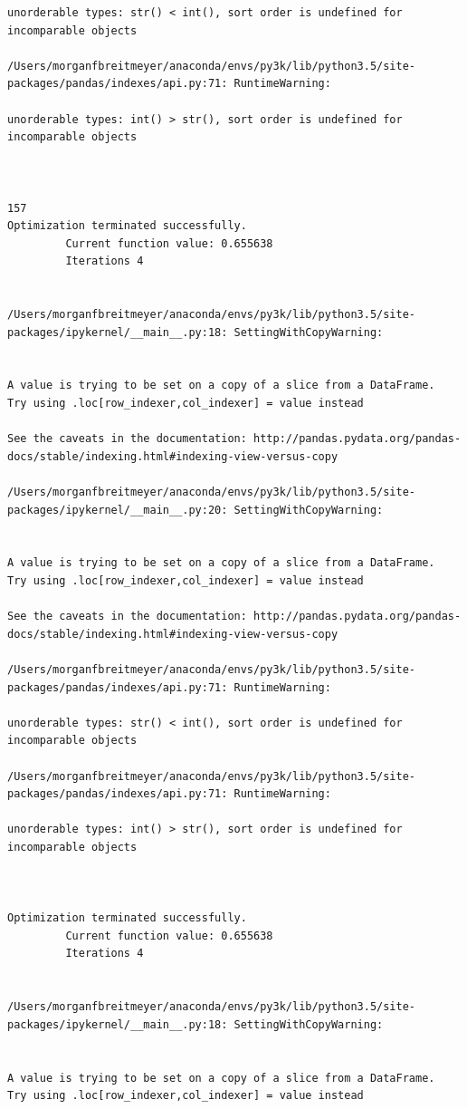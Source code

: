 \begin{lstlisting}
unorderable types: str() < int(), sort order is undefined for incomparable objects

/Users/morganfbreitmeyer/anaconda/envs/py3k/lib/python3.5/site-packages/pandas/indexes/api.py:71: RuntimeWarning:

unorderable types: int() > str(), sort order is undefined for incomparable objects



157
Optimization terminated successfully.
         Current function value: 0.655638
         Iterations 4


/Users/morganfbreitmeyer/anaconda/envs/py3k/lib/python3.5/site-packages/ipykernel/__main__.py:18: SettingWithCopyWarning:


A value is trying to be set on a copy of a slice from a DataFrame.
Try using .loc[row_indexer,col_indexer] = value instead

See the caveats in the documentation: http://pandas.pydata.org/pandas-docs/stable/indexing.html#indexing-view-versus-copy

/Users/morganfbreitmeyer/anaconda/envs/py3k/lib/python3.5/site-packages/ipykernel/__main__.py:20: SettingWithCopyWarning:


A value is trying to be set on a copy of a slice from a DataFrame.
Try using .loc[row_indexer,col_indexer] = value instead

See the caveats in the documentation: http://pandas.pydata.org/pandas-docs/stable/indexing.html#indexing-view-versus-copy

/Users/morganfbreitmeyer/anaconda/envs/py3k/lib/python3.5/site-packages/pandas/indexes/api.py:71: RuntimeWarning:

unorderable types: str() < int(), sort order is undefined for incomparable objects

/Users/morganfbreitmeyer/anaconda/envs/py3k/lib/python3.5/site-packages/pandas/indexes/api.py:71: RuntimeWarning:

unorderable types: int() > str(), sort order is undefined for incomparable objects



Optimization terminated successfully.
         Current function value: 0.655638
         Iterations 4


/Users/morganfbreitmeyer/anaconda/envs/py3k/lib/python3.5/site-packages/ipykernel/__main__.py:18: SettingWithCopyWarning:


A value is trying to be set on a copy of a slice from a DataFrame.
Try using .loc[row_indexer,col_indexer] = value instead


\end{lstlisting}
